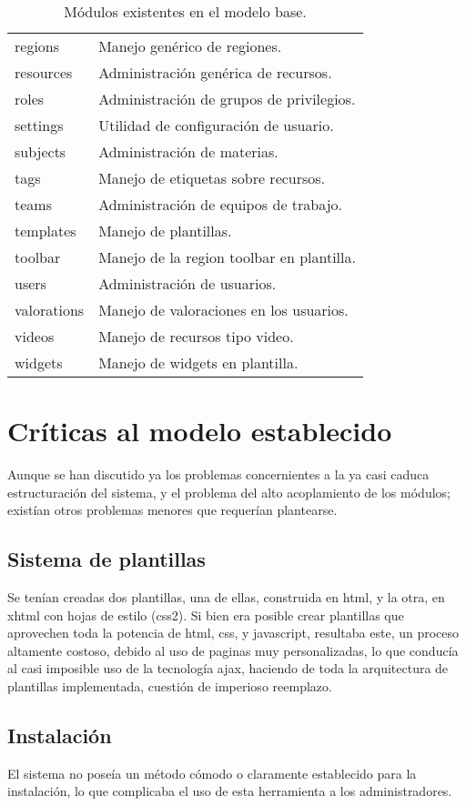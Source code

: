 \begin{table}
\begin{tabular}{l|l}
regions & Manejo genérico de regiones. \\
resources & Administración genérica de recursos. \\
roles & Administración de grupos de privilegios. \\
settings & Utilidad de configuración de usuario. \\
subjects & Administración de materias. \\
tags & Manejo de etiquetas sobre recursos. \\
teams & Administración de equipos de trabajo. \\
templates & Manejo de plantillas. \\
toolbar & Manejo de la region toolbar en plantilla. \\
users & Administración de usuarios. \\
valorations & Manejo de valoraciones en los usuarios. \\
videos & Manejo de recursos tipo video. \\
widgets & Manejo de widgets en plantilla. \\
\end{tabular}
\caption{Módulos existentes en el modelo base.}
\label{modulos_base}
\end{table}

\section{Críticas al modelo establecido}
Aunque se han discutido ya los problemas concernientes a la ya casi caduca estructuración del sistema, y el problema del
alto acoplamiento de los módulos; existían otros problemas menores que requerían plantearse.

\subsection{Sistema de plantillas}
Se tenían creadas dos plantillas, una de ellas, construida en html, y la otra, en xhtml con hojas de estilo (css2). Si
bien era posible crear plantillas que aprovechen toda la potencia de html, css, y javascript, resultaba este, un proceso
altamente costoso, debido al uso de paginas muy personalizadas, lo que conducía al casi imposible uso de la tecnología
ajax, haciendo de toda la arquitectura de plantillas implementada, cuestión de imperioso reemplazo.

\subsection{Instalación}
El sistema no poseía un método cómodo o claramente establecido para la instalación, lo que complicaba el uso de esta
herramienta a los administradores.

